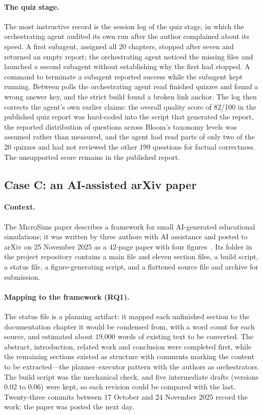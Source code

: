 \paragraph{The quiz stage.} The most instructive record is the session log of the quiz
stage, in which the orchestrating agent audited its own run after the author complained
about its speed. A first subagent, assigned all 20 chapters, stopped after seven and
returned an empty report; the orchestrating agent noticed the missing files and launched
a second subagent without establishing why the first had stopped. A command to terminate
a subagent reported success while the subagent kept running. Between polls the
orchestrating agent read finished quizzes and found a wrong answer key, and the strict
build found a broken link anchor. The log then corrects the agent's own earlier claims:
the overall quality score of 82/100 in the published quiz report was hard-coded into the
script that generated the report, the reported distribution of questions across Bloom's
taxonomy levels was assumed rather than measured, and the agent had read parts of only
two of the 20 quizzes and had not reviewed the other 199 questions for
factual correctness. The unsupported score remains in the published report.

\subsection{Case C: an AI-assisted arXiv paper}
\label{sec:case-c}

\paragraph{Context.} The MicroSims paper describes a framework for small AI-generated
educational simulations; it was written by three authors with AI assistance and posted to
arXiv on 25 November 2025 as a 42-page paper with four figures~\cite{lockhart2025microsims}.
Its folder in the project repository contains a main file and eleven section files, a
build script, a status file, a figure-generating script, and a flattened source file and
archive for submission.

\paragraph{Mapping to the framework (RQ1).} The status file is a planning artifact: it
mapped each unfinished section to the documentation chapter it would be condensed from,
with a word count for each source, and estimated about 19,000 words of existing text to
be converted. The abstract, introduction, related work and conclusion were completed
first, while the remaining sections existed as structure with comments marking the content
to be extracted---the planner--executor pattern with the authors as orchestrators. The
build script was the mechanical check, and five intermediate drafts (versions 0.02 to
0.06) were kept, so each revision could be compared with the last. Twenty-three commits
between 17 October and 24 November 2025 record the work; the paper was posted the next
day.

